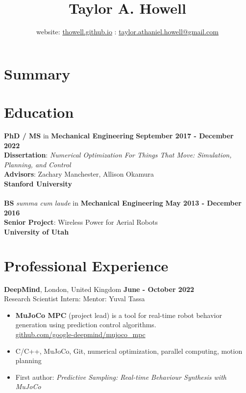 \documentclass[10pt]{article}
\title{\large \textbf{Taylor A. Howell}}
\author{
    \small {website}: \href{https://thowell.github.io}{thowell.github.io} \quad\quad {email}: \href{mailto:taylor.athaniel.howell@gmail.com}{taylor.athaniel.howell@gmail.com}
}
\date{}
\begin{document}
\thispagestyle{empty} %
\footnotesize
\maketitle
\vspace{-1.cm}

\section*{Summary}

\section*{Education}
\textbf{PhD / MS} in \textbf{Mechanical Engineering} \hfill \textbf{September 2017 - December 2022}\\
\textbf{Dissertation}: {\color{lightgray}\it Numerical Optimization For Things That Move: Simulation, Planning, and Control}\\
\textbf{Advisors}: {\color{lightgray} Zachary Manchester, Allison Okamura}\\
\textbf{Stanford University}
\\
\\
\textbf{BS} \textit{summa cum laude} in \textbf{Mechanical Engineering} \hfill \textbf{May 2013 - December 2016}\\
\textbf{Senior Project}: {\color{lightgray} Wireless Power for Aerial Robots}\\
\textbf{University of Utah}

\section*{Professional Experience}
\textbf{DeepMind}, London, United Kingdom \hfill \textbf{June - October 2022} \\
Research Scientist Intern: \hfill Mentor: {\color{lightgray} Yuval Tassa}
\begin{itemize}
    \item {\color{lightgray}\textbf{MuJoCo MPC} (project lead) is a tool for real-time robot behavior generation using prediction control algorithms.} \\\href{https://github.com/google-deepmind/mujoco_mpc}{github.com/google-deepmind/mujoco\_mpc}
    \item {\color{lightgray} C/C++, MuJoCo, Git, numerical optimization, parallel computing, motion planning}
    \item {\color{lightgray} First author: \textit{Predictive Sampling: Real-time Behaviour Synthesis with MuJoCo}}
\end{itemize}
\end{document}
